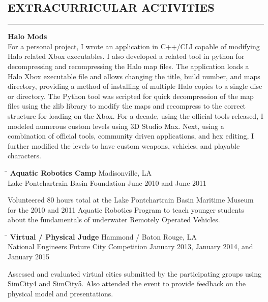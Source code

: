\documentclass{res}
\begin{document}
\begin{resume}
\section{EXTRACURRICULAR ACTIVITIES}
	\vspace{0.005in}	
	\rule{\textwidth}{0.5pt}
	{\bf Halo Mods}\\
	For a personal project, I wrote an application in C++/CLI capable of modifying Halo related Xbox executables. I also developed a related tool in python for decompressing and recompressing the Halo map files. The application loads a Halo Xbox executable file and allows changing the title, build number, and maps directory, providing a method of installing of multiple Halo copies to a single disc or directory. The Python tool was scripted for quick decompression of the map files using the zlib library to modify the maps and recompress to the correct structure for loading on the Xbox. For a decade, using the official tools released, I modeled numerous custom levels using 3D Studio Max. Next, using a combination of official tools, community driven applications, and hex editing, I further modified the levels to have custom weapons, vehicles, and playable characters.
		
		
	\begin{tabbing}
		\hspace{4.475in}\= \kill %
		{\bf Aquatic Robotics Camp} \> \hspace{0.475in}Madisonville, LA \\
		Lake Pontchartrain Basin Foundation \> June 2010 and June 2011
	\end{tabbing}\vspace{-20pt}
	\vspace{8pt}Volunteered 80 hours total at the Lake Pontchartrain Basin Maritime Museum for the 2010 and 2011 Aquatic Robotics Program to teach younger students about the fundamentals of underwater Remotely Operated Vehicles.
	
	\begin{tabbing}
		\hspace{3.125in}\= \kill %
		{\bf Virtual / Physical Judge} \> \hspace{1in}Hammond / Baton Rouge, LA \\
		National Engineers Future City Competition \> January 2013, January 2014, and January 2015
	\end{tabbing}\vspace{-20pt}
	\vspace{8pt}Assessed and evaluated virtual cities submitted by the participating groups using SimCity4 and SimCity5. Also attended the event to provide feedback on the physical model and presentations.



\end{resume}
\end{document}
